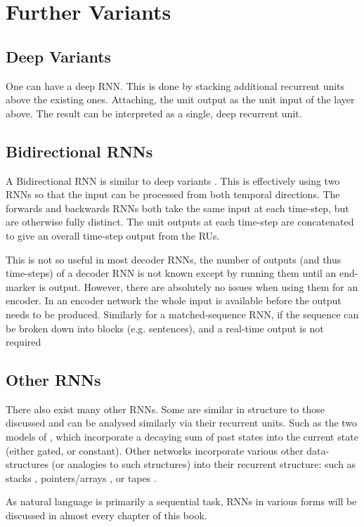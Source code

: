 \documentclass[12pt,parskip]{komatufte}
\begin{document}
\section{Further Variants}
\subsection{Deep Variants}
One can have a deep RNN.
This is done by stacking additional recurrent units above the existing ones.
Attaching, the unit output as the unit input of the layer above.
The result can be interpreted as a single, deep recurrent unit.

\subsection{Bidirectional RNNs}\label{sec:bidirection-rnns}
A Bidirectional RNN is similar to deep variants .
This is effectively using two RNNs so that the input can be processed from both temporal directions.
The forwards and backwards RNNs both take the same input at each time-step, but are otherwise fully distinct.
The unit outputs at each time-step are concatenated to give an overall time-step output from the RUs.

This is not so useful in most decoder RNNs, the number of outputs (and thus time-steps) of a decoder RNN is not known except by running them until an end-marker is output.
However, there are absolutely no issues when using them for an encoder.
In an encoder network the whole input is available before the output needs to be produced.
Similarly for a matched-sequence RNN, if  the sequence can be broken down into blocks (e.g. sentences), and a real-time output is not required


\subsection{Other RNNs}
There also exist many other RNNs.
Some are similar in structure to those discussed and can be analysed similarly via their recurrent units.
Such as the two models of , which incorporate a decaying sum of past states into the current state (either gated, or constant).
Other networks incorporate various other data-structures (or analogies to such structures) into their recurrent structure:
such as stacks , pointers/arrays , or tapes .

As natural language is primarily a sequential task, RNNs in various forms will be discussed in almost every chapter of this book.

\printbib
\end{document}
